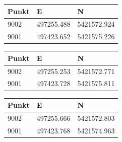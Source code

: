 \documentclass[12pt]{article}
\begin{document}
\begin{table}[ht] \centering
	\begin{tabular}{|l|l|l|}
		\hline
		Punkt & E          & N           \\ \hline
		9002  & 497255.488 & 5421572.924 \\ \hline
		9001  & 497423.652 & 5421575.226 \\ \hline
	\end{tabular}
\begin{tabular}{|l|l|l|}
	\hline
	Punkt & E          & N           \\ \hline
	9002  & 497255.253 & 5421572.771 \\ \hline
	9001  & 497423.728 & 5421575.811 \\ \hline
\end{tabular}
\begin{tabular}{|l|l|l|}
	\hline
	Punkt & E          & N           \\ \hline
	9002  & 497255.666 & 5421572.803 \\ \hline
	9001  & 497423.768 & 5421574.963 \\ \hline
\end{tabular}
\end{table}
\newpage
\end{document}
